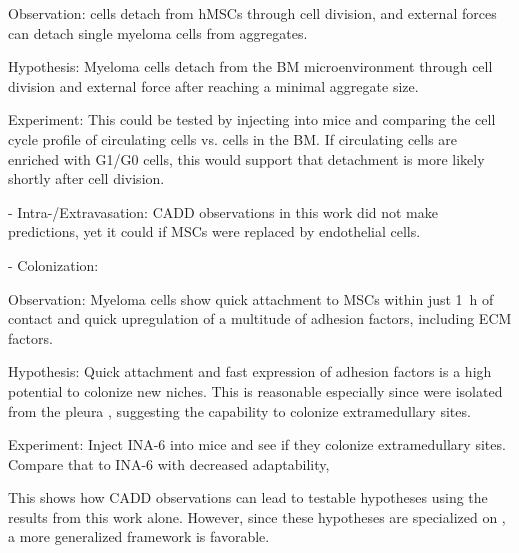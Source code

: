 Observation: \INA  cells detach from \acp{hMSC} through cell division, and external forces can detach
single myeloma cells from aggregates.

Hypothesis: Myeloma cells detach from the BM microenvironment through
cell division and external force after reaching a minimal aggregate size.

Experiment: This could be tested by injecting \INA  into mice and comparing the
cell cycle profile of circulating cells vs. cells in the BM. If circulating
cells are enriched with G1/G0 cells, this would support that detachment is more
likely shortly after cell division.


- Intra-/Extravasation: CADD observations in this work did not make predictions, yet it could if MSCs were replaced by endothelial cells.


- Colonization:

Observation: Myeloma cells show quick attachment to MSCs within just
\SI{1}{\hour} of contact and quick upregulation of a multitude of adhesion
factors, including \ac{ECM} factors.

Hypothesis: Quick attachment and fast expression of adhesion factors is a high
potential to colonize new niches. This is reasonable especially since \INA were
isolated from the pleura \cite{burgerGp130RasMediated2001c}, suggesting the
capability to colonize extramedullary sites.

Experiment: Inject INA-6 into mice and see if they colonize extramedullary
sites. Compare that to INA-6 with decreased adaptability,


This shows how CADD observations can lead to testable hypotheses using the
results from this work alone. However, since these hypotheses are specialized on
\INA, a more generalized framework is favorable.






\newcommand{\caddadaptation}{ %
      \ac{CADD} is adapted in response to different microenvironments faced
      during dissemination %
}
\newcommand{\caddadaptationtitle}{ %
      \textit{Hypothesis 1}: \ac{CADD} Adaptations during Dissemination%
}%


\newcommand{\caddadaptibility}{ %
      High adaptability of \ac{CADD} is a hallmark of aggressive myeloma %
}%
\newcommand{\caddadaptabilitytitle}{ %
      \textit{Hypothesis 2}: High Adaptability of \ac{CADD} and Myeloma
      Aggressiveness %
}%


